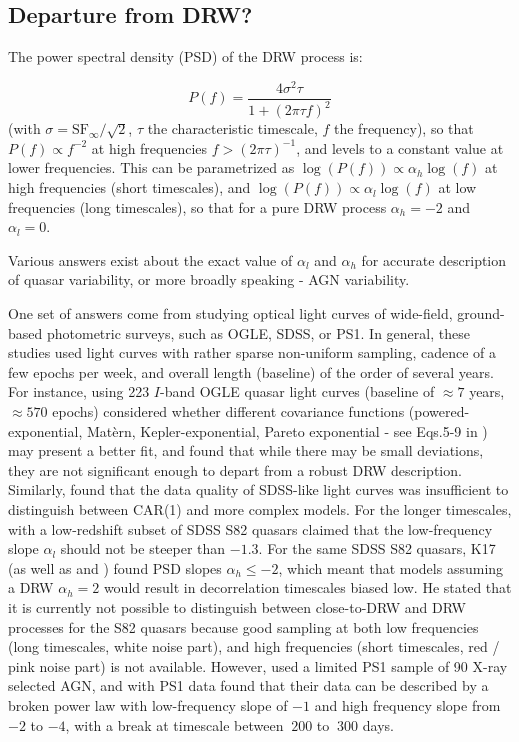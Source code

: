 \documentclass[twocolumn]{aastex62}
\begin{document}
\subsection{Departure from DRW?}

The power spectral density (PSD) of the DRW process is:

\begin{equation}
P(f) = \frac{4\sigma^{2}\tau}{1+(2 \pi \tau f)^{2}}
\end{equation}
(with $\sigma = \mathrm{SF}_{\infty} / \sqrt{2}$, $\tau$ the characteristic timescale, $f$ the frequency), so that $P(f) \propto f^{-2}$  at high frequencies $f > (2\pi \tau)^{-1}$, and levels to a constant value at lower frequencies\citep{kelly2014}. This can be parametrized as $\log{(P(f))} \propto \alpha_h \log{(f)}$ at high frequencies (short timescales), and  $\log{(P(f))} \propto \alpha_l \log{(f)}$  at low frequencies (long timescales), so that for a pure DRW process $\alpha_{h}=-2$ and $\alpha_{l} = 0$.  

Various answers exist about the exact value of  $\alpha_{l}$ and $\alpha_{h}$ for accurate description of quasar variability,  or more broadly speaking -  AGN variability. 

One set of answers come from studying optical light curves of wide-field, ground-based photometric surveys, such as OGLE, SDSS, or PS1. In general, these studies used  light curves with rather sparse non-uniform sampling, cadence of a few epochs per week,  and overall length (baseline) of the order of several years.  
For instance, \citet{zu2013}  using 223 $I$-band  OGLE quasar  light curves (baseline of  $\approx7$ years, $\approx570$ epochs) considered whether different covariance functions (powered-exponential, Mat\`ern, Kepler-exponential, Pareto exponential - see Eqs.5-9 in \citealt{zu2013}) may present a better fit, and found that while there may be small deviations, they are not significant enough to depart from a robust DRW description.  Similarly, \citet{sun2018} found that the data quality of SDSS-like light curves was insufficient to distinguish between CAR(1) and more complex models.   For the longer timescales, \cite{guo2017} with a low-redshift subset of SDSS S82 quasars  claimed  that the low-frequency slope  $\alpha_{l}$ should not be steeper than $-1.3$. For the same SDSS S82 quasars,  K17 (as well as \citealt{kozlowski2016b} and \citealt{caplar2017}) found PSD slopes $\alpha_{h} \leqslant -2$, which meant that models assuming a DRW $\alpha_{h}=2$ would result in decorrelation timescales biased low. He stated that it is currently not possible to distinguish between close-to-DRW and DRW processes for the S82 quasars because good sampling at both low frequencies (long timescales, white noise part), and high frequencies (short timescales, red / pink noise part) is not available. However, \cite{simm2016} used a limited PS1 sample of 90 X-ray selected AGN, and with PS1 data found that their data can be described by a broken power law with low-frequency slope  of $-1$ and high frequency slope from $-2$ to $-4$, with a break at timescale between $~200$ to $~300$ days.   
\end{document}
